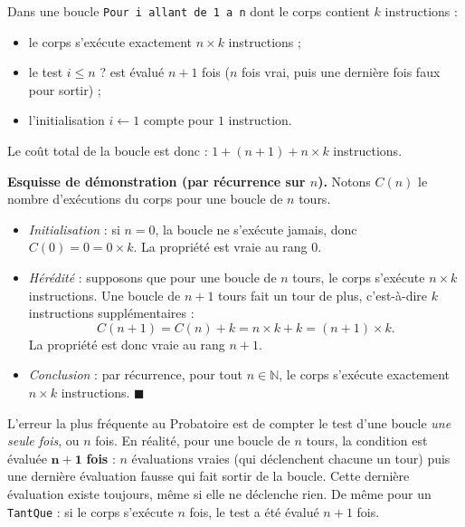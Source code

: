 \documentclass[11pt]{article}
\begin{document}
\begin{propriete}
Dans une boucle \texttt{Pour i allant de 1 a n} dont le corps contient $k$ instructions :
\begin{itemize}
\item le corps s'exécute exactement $n \times k$ instructions ;
\item le test \og $i \le n$ ? \fg{} est évalué $n + 1$ fois ($n$ fois vrai, puis une dernière fois faux pour sortir) ;
\item l'initialisation $i \leftarrow 1$ compte pour $1$ instruction.
\end{itemize}
Le coût total de la boucle est donc : $1 + (n+1) + n \times k$ instructions.
\end{propriete}

\textbf{Esquisse de démonstration (par récurrence sur $n$).} Notons $C(n)$ le nombre d'exécutions du corps pour une boucle de $n$ tours.
\begin{itemize}
\item \emph{Initialisation} : si $n = 0$, la boucle ne s'exécute jamais, donc $C(0) = 0 = 0 \times k$. La propriété est vraie au rang $0$.
\item \emph{Hérédité} : supposons que pour une boucle de $n$ tours, le corps s'exécute $n \times k$ instructions. Une boucle de $n+1$ tours fait un tour de plus, c'est-à-dire $k$ instructions supplémentaires :
\[ C(n+1) = C(n) + k = n \times k + k = (n+1) \times k. \]
La propriété est donc vraie au rang $n+1$.
\item \emph{Conclusion} : par récurrence, pour tout $n \in \mathbb{N}$, le corps s'exécute exactement $n \times k$ instructions. \hfill$\blacksquare$
\end{itemize}

\begin{attention}
L'erreur la plus fréquente au Probatoire est de compter le test d'une boucle \emph{une seule fois}, ou $n$ fois. En réalité, pour une boucle de $n$ tours, la condition est évaluée $\boldsymbol{n+1}$ \textbf{fois} : $n$ évaluations \og vraies \fg{} (qui déclenchent chacune un tour) puis une dernière évaluation \og fausse \fg{} qui fait sortir de la boucle. Cette dernière évaluation existe toujours, même si elle ne déclenche rien. De même pour un \texttt{TantQue} : si le corps s'exécute $n$ fois, le test a été évalué $n+1$ fois.
\end{attention}
\end{document}
